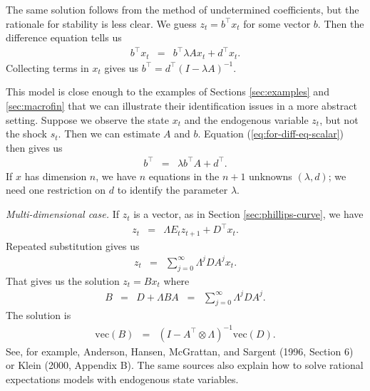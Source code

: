 \documentclass[12pt]{article}
\newcounter{tab}
\begin{document}
{The same solution follows from the method of undetermined coefficients,
but the rationale for stability is less clear.
We guess $ z_t = b^\top x_t$ for some vector $b$.
Then the difference equation tells us
\begin{eqnarray*}
    b^\top x_t &=&  b^\top \lambda A x_t + d^\top x_t .
\end{eqnarray*}
Collecting terms in $x_t$ gives us
$ b^\top =  d^\top (I-\lambda A)^{-1} $.

This model is close enough to the examples of Sections \ref{sec:examples} and \ref{sec:macrofin}
that we can illustrate their identification issues in a more abstract setting.
Suppose we observe the state $x_t$ and the endogenous variable $z_t$,
but not the shock $s_t$.
Then we can estimate $A$ and $b$.
Equation (\ref{eq:for-diff-eq-scalar}) then gives us
\begin{eqnarray*}
    b^\top &=& \lambda b^\top A + d^\top .
\end{eqnarray*}
If $x$ has dimension $n$, we have $n$ equations in the
$n+1$ unknowns $(\lambda, d)$;
we need one restriction on $d$ to identify the
parameter $\lambda$.


{\it Multi-dimensional case.\/}
If $z_t$ is a vector, as in Section \ref{sec:phillips-curve},
we have
\begin{eqnarray*}
    z_t &=&    \Lambda E_t z_{t+1} + D^\top x_{t} .
\end{eqnarray*}
Repeated substitution gives us
\begin{eqnarray*}
    z_t &=&  \sum_{j=0}^\infty \Lambda^j D A^j x_{t} .
\end{eqnarray*}
That gives us the solution $ z_t = B x_t$ where
\begin{eqnarray*}
    B &=& D + \Lambda B A \;\;=\;\; \sum_{j=0}^\infty \Lambda^j D A^j .
\end{eqnarray*}
The solution is
\begin{eqnarray*}
    \mbox{vec}(B) &=& (I - A^\top \otimes \Lambda)^{-1} \mbox{vec} (D) .
\end{eqnarray*}
See, for example,
Anderson, Hansen, McGrattan, and Sargent (1996, Section 6) or Klein (2000, Appendix B).
The same sources also explain how to solve
rational expectations models with endogenous state variables.


%


}
\end{document}
